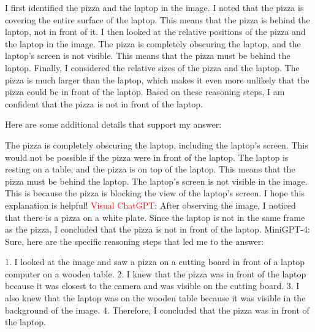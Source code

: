 \begin{enumerate}
        I first identified the pizza and the laptop in the image.
        I noted that the pizza is covering the entire surface of the laptop. This means that the pizza is behind the laptop, not in front of it.
        I then looked at the relative positions of the pizza and the laptop in the image. The pizza is completely obscuring the laptop, and the laptop's screen is not visible. This means that the pizza must be behind the laptop.
        Finally, I considered the relative sizes of the pizza and the laptop. The pizza is much larger than the laptop, which makes it even more unlikely that the pizza could be in front of the laptop.
        Based on these reasoning steps, I am confident that the pizza is not in front of the laptop.

        Here are some additional details that support my answer:

        The pizza is completely obscuring the laptop, including the laptop's screen. This would not be possible if the pizza were in front of the laptop.
        The laptop is resting on a table, and the pizza is on top of the laptop. This means that the pizza must be behind the laptop.
        The laptop's screen is not visible in the image. This is because the pizza is blocking the view of the laptop's screen.
        I hope this explanation is helpful!
        \subitem \textcolor{red}{Visual ChatGPT}: After observing the image, I noticed that there is a pizza on a white plate. Since the laptop is not in the same frame as the pizza, I concluded that the pizza is not in front of the laptop.
        \subitem MiniGPT-4: Sure, here are the specific reasoning steps that led me to the answer:

        1. I looked at the image and saw a pizza on a cutting board in front of a laptop computer on a wooden table.
        2. I knew that the pizza was in front of the laptop because it was closest to the camera and was visible on the cutting board.
        3. I also knew that the laptop was on the wooden table because it was visible in the background of the image.
        4. Therefore, I concluded that the pizza was in front of the laptop.
    \end{enumerate}

